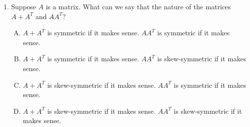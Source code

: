 \documentclass[10pt]{amsart}
\begin{document}
\begin{enumerate}
  {\em Answer}: Option (C)

  {\em Explanation}: The condition that $A^T = A^{-1}$ can be
  interpreted in two equivalent ways: $AA^T = I_n$ and $A^TA = I_n$.

  With the $AA^T = I_n$ interpretation, we see that the dot product of
  each row of $A$ with the corresponding column of $A^T$ is $1$, and
  the dot product of each row of $A$ with a different column of $A^T$
  is $0$. Since the ``corresponding column of $A^T$'' agrees with the
  original row of $A$, we obtain that the dot product of each row of
  $A$ with itself is $1$ (i.e., each row of $A$ is a unit vector) and
  the dot product of any two distinct rows of $A$ is $0$, i.e., any
  two distinct rows of $A$ are orthogonal.

  With the $A^TA = I_n$ interpretation, we obtain the analogous result
  for columns, because we are now dealing with dot products between
  rows of $A^T$ and columns of $A$.

  {\em Performance review}: 22 out of 25 got this. 2 chose (B), 1 chose (A).

  \vspace{0.5in}

  A square matrix $A$ is termed {\em symmetric} if $A = A^T$ and {\em
    skew-symmetric} if $A = -A^T$. 

  The following facts are true and can be easily verified:

  \begin{itemize}
  \item Suppose $A$ and $B$ are matrices such that $A + B$ makes
    sense. Then, $(A + B)^T = A^T + B^T$.
  \item Suppose $A$ and $B$ are matrices such that $AB$ makes
    sense. Then, $(AB)^T = B^TA^T$. Note that the order of
    multiplication flips over. The rule is similar to the rule for
    inverses, even though the transpose is {\em not} the same as the
    inverse.
  \item For any matrix $A$, $(A^T)^T = A$.
  \end{itemize}

\item Suppose $A$ is a matrix. What can we say that the nature of the
  matrices $A + A^T$ and $AA^T$?

  \begin{enumerate}[(A)]
  \item $A + A^T$ is symmetric if it makes sense. $AA^T$ is symmetric
    if it makes sense.
  \item $A + A^T$ is symmetric if it makes sense. $AA^T$ is
    skew-symmetric if it makes sense.
  \item $A + A^T$ is skew-symmetric if it makes sense. $AA^T$ is
    symmetric if it makes sense.
  \item $A + A^T$ is skew-symmetric if it makes sense. $AA^T$ is
    skew-symmetric if it makes sense.
  \end{enumerate}


\end{enumerate}
\end{document}
